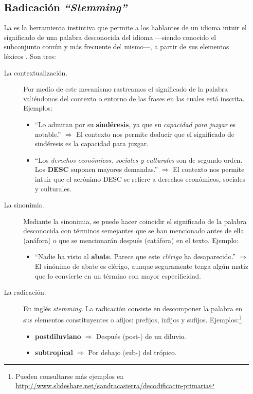 \FloatBarrier
\subsection{Radicación \emph{``Stemming''}}

La  es la herramienta instintiva que permite a los hablantes de un idioma intuir el significado de una palabra desconocida del idioma ---siendo conocido el subconjunto común y más frecuente del mismo---, a partir de sus elementos léxicos \citep{Zubira2002}. Son tres:
\nopagebreak
\begin{description}
\item[La contextualización.] Por medio de este mecanismo rastreamos el significado de la palabra valiéndonos del contexto o entorno de las frases en las cuales está inscrita. Ejemplos:
\nopagebreak
\begin{itemize}
\item ``Lo admiran por su \textbf{sindéresis}, ya que su \emph{capacidad para juzgar} es notable.'' $\Longrightarrow$ El contexto nos permite deducir que el significado de sindéresis es la capacidad para juzgar.
\item ``Los \emph{derechos económicos, sociales y culturales} son de segundo orden. Los \textbf{DESC} suponen mayores demandas.'' $\Longrightarrow$ El contexto nos permite intuir que el acrónimo DESC se refiere a derechos económicos, sociales y culturales.
\end{itemize}
%
\item[La sinonimia.] Mediante la sinonimia, se puede hacer coincidir el significado de la palabra desconocida con términos semejantes que se han mencionado antes de ella (anáfora) o que se mencionarán después (catáfora) en el texto. Ejemplo:
\nopagebreak
\begin{itemize}
\item ``Nadie ha visto al \textbf{abate}. Parece que este \emph{clérigo} ha desaparecido.'' $\Longrightarrow$ El sinónimo de abate es clérigo, aunque seguramente tenga algún matiz que lo convierte en un término con mayor especificidad.
\end{itemize}
%
\item[La radicación.] En inglés \emph{stemming}. La radicación consiste en descomponer la palabra en sus elementos constituyentes o afijos: prefijos, infijos y sufijos. Ejemplos:\footnote{Pueden consultarse más ejemplos en \url{http://www.slideshare.net/sandracasierra/decodificacin-primaria}}
\nopagebreak
\begin{itemize}
\item \textbf{postdiluviano} $\Longrightarrow$ Después (post-) de un diluvio.
\item \textbf{subtropical}  $\Longrightarrow$ Por debajo (sub-) del trópico.
\end{itemize}
\end{description}

